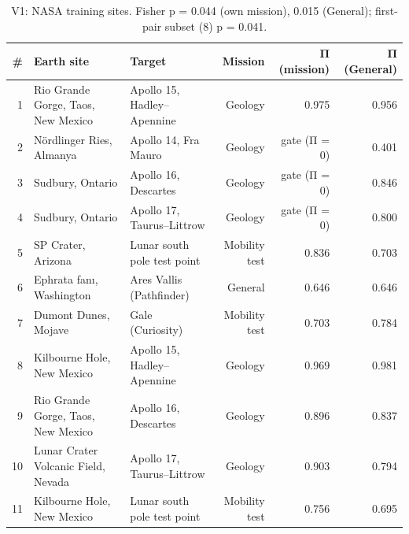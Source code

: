 \begin{table}[ht]
\centering\small
\caption{V1: NASA training sites. Fisher p = 0.044 (own mission), 0.015 (General); first-pair subset (8) p = 0.041.}
\label{tab:v1}
\begin{tabular}{rllrrr}
\hline
\# & Earth site & Target & Mission & Π (mission) & Π (General) \\
\hline
1 & Rio Grande Gorge, Taos, New Mexico & Apollo 15, Hadley–Apennine & Geology & 0.975 & 0.956 \\
2 & Nördlinger Ries, Almanya & Apollo 14, Fra Mauro & Geology & gate (Π = 0) & 0.401 \\
3 & Sudbury, Ontario & Apollo 16, Descartes & Geology & gate (Π = 0) & 0.846 \\
4 & Sudbury, Ontario & Apollo 17, Taurus–Littrow & Geology & gate (Π = 0) & 0.800 \\
5 & SP Crater, Arizona & Lunar south pole test point & Mobility test & 0.836 & 0.703 \\
6 & Ephrata fanı, Washington & Ares Vallis (Pathfinder) & General & 0.646 & 0.646 \\
7 & Dumont Dunes, Mojave & Gale (Curiosity) & Mobility test & 0.703 & 0.784 \\
8 & Kilbourne Hole, New Mexico & Apollo 15, Hadley–Apennine & Geology & 0.969 & 0.981 \\
9 & Rio Grande Gorge, Taos, New Mexico & Apollo 16, Descartes & Geology & 0.896 & 0.837 \\
10 & Lunar Crater Volcanic Field, Nevada & Apollo 17, Taurus–Littrow & Geology & 0.903 & 0.794 \\
11 & Kilbourne Hole, New Mexico & Lunar south pole test point & Mobility test & 0.756 & 0.695 \\
\hline
\end{tabular}
\end{table}